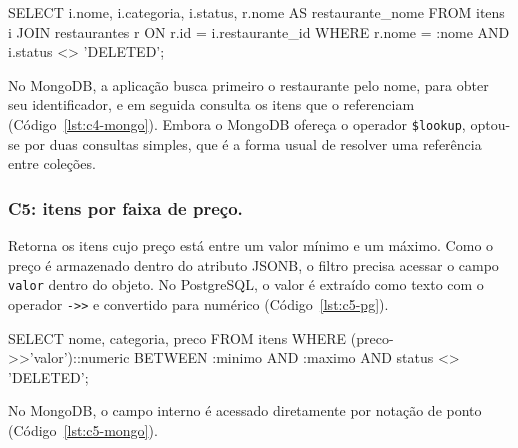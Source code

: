 \begin{codigo}[language=SQL, breaklines=true, caption={C4 no PostgreSQL.}, label={lst:c4-pg}]
SELECT i.nome, i.categoria, i.status, r.nome AS restaurante_nome
FROM itens i
JOIN restaurantes r ON r.id = i.restaurante_id
WHERE r.nome = :nome AND i.status <> 'DELETED';
\end{codigo}

No MongoDB, a aplicação busca primeiro o restaurante pelo nome, para obter seu identificador, e em seguida consulta os itens que o referenciam (Código~\ref{lst:c4-mongo}). Embora o MongoDB ofereça o operador \texttt{\$lookup}, optou-se por duas consultas simples, que é a forma usual de resolver uma referência entre coleções. 



\subsubsection{C5: itens por faixa de preço.} Retorna os itens cujo preço está entre um valor mínimo e um máximo. Como o preço é armazenado dentro do atributo JSONB, o filtro precisa acessar o campo \texttt{valor} dentro do objeto. No PostgreSQL, o valor é extraído como texto com o operador \texttt{->>} e convertido para numérico (Código~\ref{lst:c5-pg}).

\begin{codigo}[language=SQL, breaklines=true, caption={C5 no PostgreSQL.}, label={lst:c5-pg}]
SELECT nome, categoria, preco
FROM itens
WHERE (preco->>'valor')::numeric BETWEEN :minimo AND :maximo
  AND status <> 'DELETED';
\end{codigo}

No MongoDB, o campo interno é acessado diretamente por notação de ponto (Código~\ref{lst:c5-mongo}).



